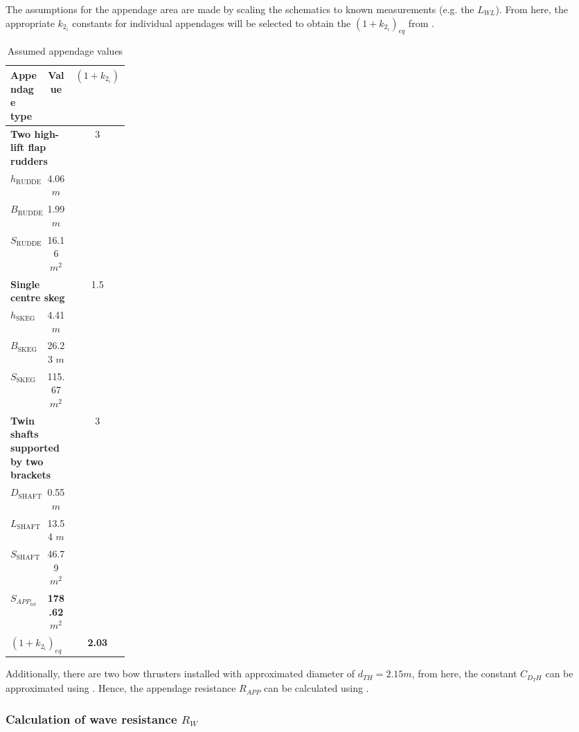 The assumptions for the appendage area are made by scaling the schematics to known measurements (e.g. the $L_{WL}$). From here, the appropriate $k_{2_i}$ constants for individual appendages will be selected to obtain the $(1+k_{2_i})_{eq}$ from .

\begin{table}[ht]
    \footnotesize
    \centering
    {\begin{tabular}{ p{0.2\linewidth} c c}
    \hline
    Appendage type & Value & $(1+k_{2_i})$ \\
    \hline
    \multicolumn{2}{l}{\textbf{Two high-lift flap rudders}} & 3\\
    \hline
    $h_{\text{RUDDER}}$ & 4.06 $m$\\
    $B_{\text{RUDDER}}$ & 1.99 $m$\\
    $S_{\text{RUDDER}}$ & 16.16 $m^2$\\
    \hline
    \multicolumn{2}{l}{\textbf{Single centre skeg}} & 1.5\\
    \hline
    $h_{\text{SKEG}}$ & 4.41 $m$\\
    $B_{\text{SKEG}}$ & 26.23 $m$\\
    $S_{\text{SKEG}}$ & 115.67 $m^2$\\
    \hline
    \multicolumn{2}{l}{\textbf{Twin shafts supported by two brackets}} & 3\\
    \hline
    $D_{\text{SHAFT}}$ & 0.55 $m$\\
    $L_{\text{SHAFT}}$ & 13.54 $m$\\
    $S_{\text{SHAFT}}$ & 46.79 $m^2$\\
    \hline
    \multicolumn{1}{l}{\textbf{$S_{APP_{tot}}$}} & \textbf{178.62} $m^2$ \\
    \multicolumn{2}{l}{\textbf{$(1+k_{2_i})_{eq}$}} & \textbf{2.03} \\
    \end{tabular}}
\caption{Assumed appendage values}\label{tbl:assume_appendage_dimension}
\end{table}

Additionally, there are two bow thrusters installed with approximated diameter of $d_{TH}= 2.15 m$, from here, the constant $C_{D_TH}$ can be approximated using . Hence, the appendage resistance $R_{APP}$ can be calculated using .

\subsubsection*{Calculation of wave resistance $R_{W}$}

